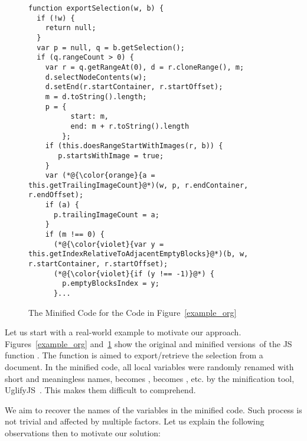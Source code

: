 \begin{figure}[t]
	\centering
	\begin{lstlisting}[]
function exportSelection(w, b) {
  if (!w) {
    return null;
  }
  var p = null, q = b.getSelection();
  if (q.rangeCount > 0) {
    var r = q.getRangeAt(0), d = r.cloneRange(), m;
    d.selectNodeContents(w);
    d.setEnd(r.startContainer, r.startOffset);
    m = d.toString().length;
    p = {
          start: m,
          end: m + r.toString().length
        };
    if (this.doesRangeStartWithImages(r, b)) {
       p.startsWithImage = true;
    }
    var (*@{\color{orange}{a = this.getTrailingImageCount}@*)(w, p, r.endContainer, r.endOffset);
    if (a) {
      p.trailingImageCount = a;
    }
    if (m !== 0) {
      (*@{\color{violet}{var y = this.getIndexRelativeToAdjacentEmptyBlocks}@*)(b, w, r.startContainer, r.startOffset);
      (*@{\color{violet}{if (y !== -1)}@*) {
        p.emptyBlocksIndex = y;
      }...
\end{lstlisting}
\vspace{-12pt}
\caption{The Minified Code for the Code in Figure~\ref{example_org}}
\label{example_sim}
\end{figure}

Let us start with a real-world example to motivate our approach.
Figures~\ref{example_org} and~\ref{example_sim} show the original and
minified versions~of the JS function .  The
function is aimed to export/retrieve the selection from a document.
%
In the minified code, all local variables were randomly renamed with
short and meaningless names, \eg {} becomes ,
 becomes , etc. by the minification tool,
\eg UglifyJS~\cite{uglifyJS}. This makes them difficult to
comprehend.


We aim to recover the names of the variables in the minified
code. Such process is not trivial and affected by multiple factors.
Let us explain the following observations then to motivate our
solution:

